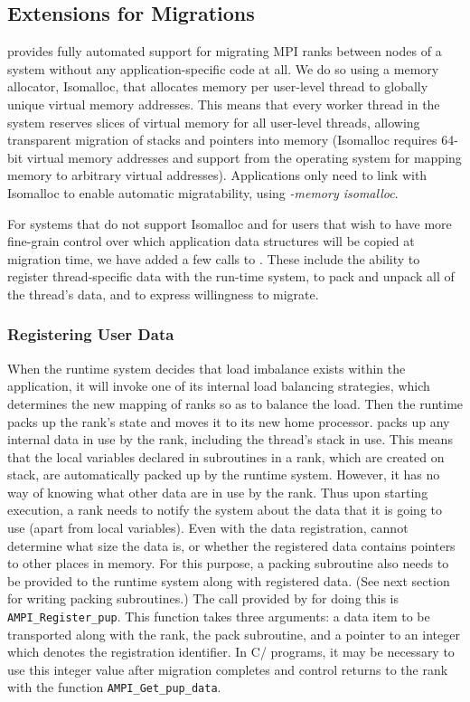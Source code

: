 \documentclass[10pt]{article}
\begin{document}
\subsection{Extensions for Migrations}

\ampi{} provides fully automated support for migrating MPI ranks between nodes of a
system without any application-specific code at all. We do so using a memory
allocator, Isomalloc, that allocates memory per user-level thread to globally
unique virtual memory addresses. This means that every worker thread in the system
reserves slices of virtual memory for all user-level threads, allowing transparent migration
of stacks and pointers into memory (Isomalloc requires 64-bit virtual memory
addresses and support from the operating system for mapping memory to arbitrary
virtual addresses). Applications only need to link with Isomalloc to enable
automatic migratability, using \emph{-memory isomalloc}.

For systems that do not support Isomalloc and for users that wish to have more
fine-grain control over which application data structures will be copied at
migration time, we have added a few calls to \ampi{}. These include
the ability to register thread-specific data with the run-time system, to pack
and unpack all of the thread's data, and to express willingness to migrate.

\subsubsection{Registering User Data}

When the \ampi{} runtime system decides that load imbalance exists within the
application, it will invoke one of its internal load balancing strategies,
which determines the new mapping of \ampi{} ranks so as to balance the load.
Then the \ampi{} runtime packs up the rank's state and moves it to its new
home processor. \ampi{} packs up any internal data in use by the rank,
including the thread's stack in use. This means that the local variables
declared in subroutines in a rank, which are created on stack, are
automatically packed up by the \ampi{} runtime system. However, it has no way
of knowing what other data are in use by the rank. Thus upon starting
execution, a rank needs to notify the system about the data that it is going
to use (apart from local variables). Even with the data registration, \ampi{}
cannot determine what size the data is, or whether the registered data contains
pointers to other places in memory. For this purpose, a packing subroutine also
needs to be provided to the \ampi{} runtime system along with registered data.
(See next section for writing packing subroutines.) The call provided by
\ampi{} for doing this is \texttt{AMPI\_Register\_pup}. This function takes three
arguments: a data item to be transported along with the rank, the pack
subroutine, and a pointer to an integer which denotes the registration identifier.
In C/\CC{} programs, it may be necessary to use this integer value after migration
completes and control returns to the rank with the function
\texttt{AMPI\_Get\_pup\_data}.
\end{document}
